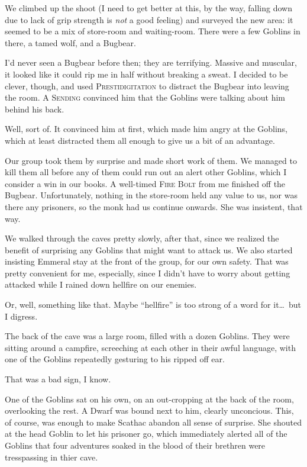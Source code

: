 We climbed up the shoot (I need to get better at this, by the way, falling down due to lack of grip strength is \emph{not} a good feeling) and surveyed the new area: it seemed to be a mix of store-room and waiting-room. There were a few Goblins in there, a tamed wolf, and a Bugbear.

I'd never seen a Bugbear before then; they are terrifying. Massive and muscular, it looked like it could rip me in half without breaking a sweat. I decided to be clever, though, and used \textsc{Prestidigitation} to distract the Bugbear into leaving the room. A \textsc{Sending} convinced him that the Goblins were talking about him behind his back.

Well, sort of. It convinced him at first, which made him angry at the Goblins, which at least distracted them all enough to give us a bit of an advantage.

Our group took them by surprise and made short work of them. We managed to kill them all before any of them could run out an alert other Goblins, which I consider a win in our books. A well-timed \textsc{Fire Bolt} from me finished off the Bugbear. Unfortunately, nothing in the store-room held any value to us, nor was there any prisoners, so the monk had us continue onwards. She was insistent, that way.

We walked through the caves pretty slowly, after that, since we realized the benefit of surprising any Goblins that might want to attack us. We also started insisting Emmeral stay at the front of the group, for our own safety. That was pretty convenient for me, especially, since I didn't have to worry about getting attacked while I rained down hellfire on our enemies.

Or, well, something like that. Maybe ``hellfire'' is too strong of a word for it\dots\ but I digress.

The back of the cave was a large room, filled with a dozen Goblins. They were sitting around a campfire, screeching at each other in their awful language, with one of the Goblins repeatedly gesturing to his ripped off ear.

That was a bad sign, I know.

One of the Goblins sat on his own, on an out-cropping at the back of the room, overlooking the rest. A Dwarf was bound next to him, clearly unconcious. This, of course, was enough to make Scathac abandon all sense of surprise. She shouted at the head Goblin to let his prisoner go, which immediately alerted all of the Goblins that four adventures soaked in the blood of their brethren were tresspassing in thier cave.

